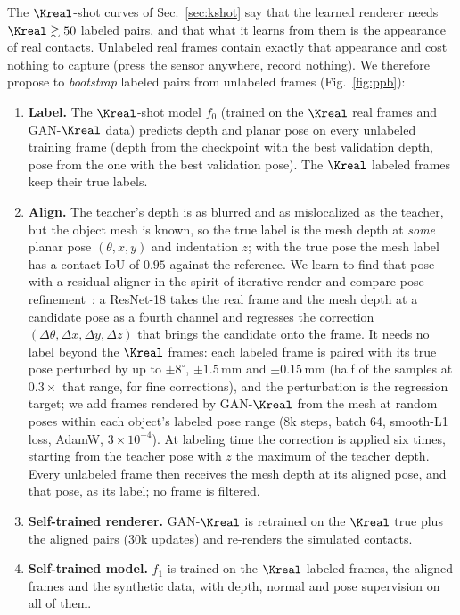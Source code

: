 The $\Kreal$-shot curves of Sec.~\ref{sec:kshot} say that the learned renderer needs $\Kreal\gtrsim50$ labeled pairs, and that what it learns from them is the appearance of real contacts. Unlabeled real frames contain exactly that appearance and cost nothing to capture (press the sensor anywhere, record nothing). We therefore propose to \emph{bootstrap} labeled pairs from unlabeled frames (Fig.~\ref{fig:ppb}):
\begin{enumerate}
    \item \textbf{Label.} The $\Kreal$-shot model $f_0$ (trained on the $\Kreal$ real frames and GAN-$\Kreal$ data) predicts depth and planar pose on every unlabeled training frame (depth from the checkpoint with the best validation depth, pose from the one with the best validation pose). The $\Kreal$ labeled frames keep their true labels.
    \item \textbf{Align.} The teacher's depth is as blurred and as mislocalized as the teacher, but the object mesh is known, so the true label is the mesh depth at \emph{some} planar pose $(\theta,x,y)$ and indentation $z$; with the true pose the mesh label has a contact IoU of $0.95$ against the reference. We learn to find that pose with a residual aligner in the spirit of iterative render-and-compare pose refinement~\cite{li2018deepim,wang2020self6d}: a ResNet-18 takes the real frame and the mesh depth at a candidate pose as a fourth channel and regresses the correction $(\Delta\theta,\Delta x,\Delta y,\Delta z)$ that brings the candidate onto the frame. It needs no label beyond the $\Kreal$ frames: each labeled frame is paired with its true pose perturbed by up to $\pm8^\circ$, $\pm1.5\,$mm and $\pm0.15\,$mm (half of the samples at $0.3\times$ that range, for fine corrections), and the perturbation is the regression target; we add frames rendered by GAN-$\Kreal$ from the mesh at random poses within each object's labeled pose range (8k steps, batch 64, smooth-L1 loss, AdamW, $3\times10^{-4}$). At labeling time the correction is applied six times, starting from the teacher pose with $z$ the maximum of the teacher depth. Every unlabeled frame then receives the mesh depth at its aligned pose, and that pose, as its label; no frame is filtered.
    \item \textbf{Self-trained renderer.} GAN-$\Kreal$ is retrained on the $\Kreal$ true plus the aligned pairs (30k updates) and re-renders the simulated contacts.
    \item \textbf{Self-trained model.} $f_1$ is trained on the $\Kreal$ labeled frames, the aligned frames and the synthetic data, with depth, normal and pose supervision on all of them.
\end{enumerate}
